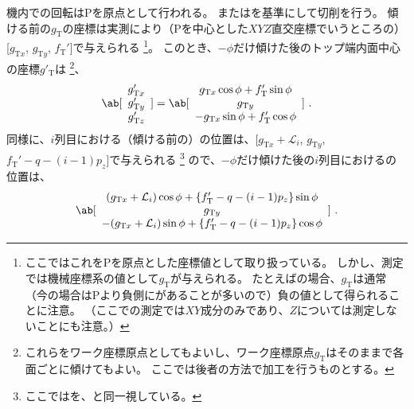 \clearpage
機内での回転は\TableCenter Pを原点として行われる。
また\DimpleMilling は\TopIDCenter を基準にして切削を行う。
傾ける前の\TopIDCenter $g_\mathrm T$の座標は実測により（Pを中心とした$XYZ$直交座標でいうところの）[$g_{\mathrm Tx}$, $g_{\mathrm Ty}$, $f_\mathrm T'$]で与えられる
\footnote{ここではこれを\TableCenter Pを原点とした座標値として取り扱っている。
しかし、測定では機械座標系の値として$g_\mathrm T$が与えられる。
たとえば\Dimple の場合、$g_\mathrm T$は通常（今の場合は\TableCenter Pより負側に\CurvatureCenter があることが多いので）負の値として得られることに注意。
（ここでの測定では$XY$成分のみであり、$Z$については測定しないことにも注意。）}。
このとき、\DimpleAngle$-\phi$だけ傾けた後のトップ端内面中心の座標$g'_\mathrm T$は
\footnote{これらをワーク座標原点としてもよいし、ワーク座標原点$g_\mathrm T$はそのままで各面ごとに傾けてもよい。
ここでは後者の方法で加工を行うものとする。}、
\begin{align}
  \label{eq:afterPhiTCenterFromO}
  \ab[
  \begin{array}{c}
    g_{\mathrm Tx}'\\
    g_{\mathrm Ty}'\\
    g_{\mathrm Tz}'
  \end{array}
  ]
  =\ab[
   \begin{array}{c}
     g_{\mathrm Tx}\cos\phi+f_\mathrm T'\sin\phi\\
     g_{\mathrm Ty}\\
     -g_{\mathrm Tx}\sin\phi+f_\mathrm T'\cos\phi
   \end{array}
   ]\ .
   \end{align}
同様に、$i$列目における（傾ける前の）\CurvatureCenter の位置は、[$g_{\mathrm Tx}+\mathcal L_i$, $g_{\mathrm Ty}$, $f_\mathrm T'-q-(i-1)p_z$]で与えられる
\footnote{ここでは\TopCurvatureCenter を、\TopIDCenter と同一視している。}
ので、\DimpleAngle$-\phi$だけ傾けた後の$i$列目における\CurvatureCenter の位置は、
\begin{align*}
  \ab[
  \begin{array}{c}
    (g_{\mathrm Tx}+\mathcal L_i)\cos\phi+\{f_\mathrm T'-q-(i-1)p_z\}\sin\phi\\
    g_{\mathrm Ty}\\
    -(g_{\mathrm Tx}+\mathcal L_i)\sin\phi+\{f_\mathrm T'-q-(i-1)p_z\}\cos\phi
  \end{array}
  ]\ .
\end{align*}
